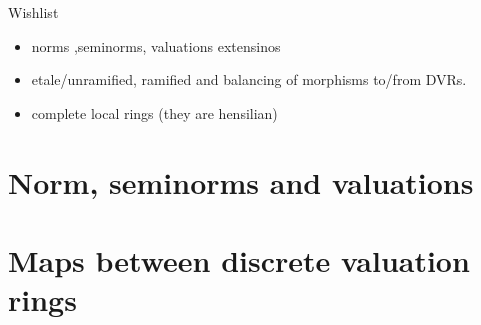 
Wishlist
\begin{itemize}
	\item norms ,seminorms, valuations extensinos
	\item etale/unramified, ramified and  balancing of morphisms to/from DVRs. 
	\item complete local rings (they are hensilian)
\end{itemize}

\section{Norm, seminorms and valuations} \label{sec:norm,_seminorms_and_valuations}


\section{Maps between discrete valuation rings} \label{sec:maps_between_discrete_valuation_rings}


